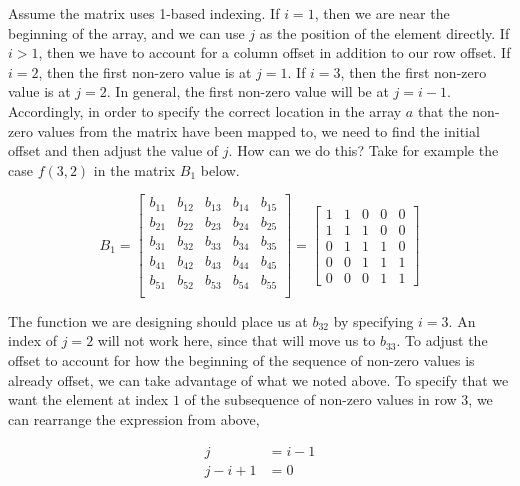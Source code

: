 \documentclass[12pt,letterpaper,final]{report}
\begin{document}
\begin{enumerate}
        Assume the matrix uses 1-based indexing. If $i = 1$, then we are near the beginning of the array, and we can use $j$ as the position of the element directly. If $i > 1$, then we have to account for a column offset in addition to our row offset. If $i = 2$, then the first non-zero value is at $j = 1$. If $i = 3$, then the first non-zero value is at $j = 2$. In general, the first non-zero value will be at $j = i - 1$. Accordingly, in order to specify the correct location in the array $a$ that the non-zero values from the matrix have been mapped to, we need to find the initial offset and then adjust the value of $j$. How can we do this? Take for example the case $f(3,2)$ in the matrix $B_1$ below.

        \[
          B_1 =
          \begin{bmatrix}
            b_{11} & b_{12}         & b_{13} & b_{14} & b_{15} \\
            b_{21} & b_{22}         & b_{23} & b_{24} & b_{25} \\
            b_{31} & \boxed{b_{32}} & b_{33} & b_{34} & b_{35} \\
            b_{41} & b_{42}         & b_{43} & b_{44} & b_{45} \\
            b_{51} & b_{52}         & b_{53} & b_{54} & b_{55} \\
          \end{bmatrix}
          =
          \begin{bmatrix}
            1 & 1         & 0 & 0 & 0 \\
            1 & 1         & 1 & 0 & 0 \\
            0 & \boxed{1} & 1 & 1 & 0 \\
            0 & 0         & 1 & 1 & 1 \\
            0 & 0         & 0 & 1 & 1
          \end{bmatrix}
        \]

        The function we are designing should place us at $b_{32}$ by specifying $i=3$. An index of $j=2$ will not work here, since that will move us to $b_{33}$. To adjust the offset to account for how the beginning of the sequence of non-zero values is already offset, we can take advantage of what we noted above. To specify that we want the element at index $1$ of the subsequence of non-zero values in row $3$, we can rearrange the expression from above,

        \begin{align*}
          j         & = i - 1 \\
          j - i + 1 & = 0
        \end{align*}


\end{enumerate}
\end{document}
